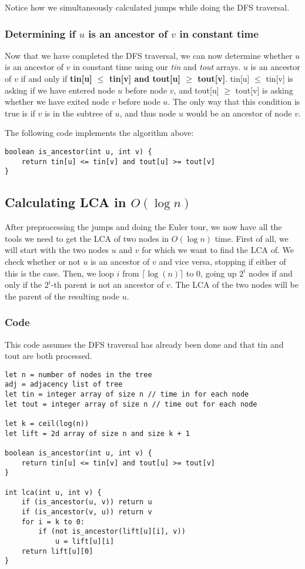 \documentclass{article}
\begin{document}
Notice how we simultaneously calculated jumps while doing the DFS traversal.


\subsubsection{Determining if $u$ is an ancestor of $v$ in constant time}
Now that we have completed the DFS traversal, we can now determine whether $u$ is an ancestor of $v$ in constant time using our \textit{tin} and \textit{tout} arrays. $u$ is an ancestor of $v$ if and only if \textbf{tin[u] $\leq$ tin[v] and tout[u] $\geq$ tout[v]}. tin[u] $\leq$ tin[v] is asking if we have entered node $u$ before node $v$, and tout[u] $\geq$ tout[v] is asking whether we have exited node $v$ before node $u$. The only way that this condition is true is if $v$ is in the subtree of $u$, and thus node $u$ would be an ancestor of node $v$.

The following code implements the algorithm above:
\begin{lstlisting}
boolean is_ancestor(int u, int v) {
	return tin[u] <= tin[v] and tout[u] >= tout[v]
}
\end{lstlisting}

\subsection{Calculating LCA in $O(\log n)$}
After preprocessing the jumps and doing the Euler tour, we now have all the tools we need to get the LCA of two nodes in $O(\log n)$ time. First of all, we will start with the two nodes $u$ and $v$ for which we want to find the LCA of. We check whether or not $u$ is an ancestor of $v$ and vice versa, stopping if either of this is the case. Then, we loop $i$ from $\lceil \log (n) \rceil $ to $0$, going up $2^i$ nodes if and only if the $2^i$-th parent is not an ancestor of $v$. The LCA of the two nodes will be the parent of the resulting node $u$.

\subsubsection{Code}
This code assumes the DFS traversal has already been done and that tin and tout are both processed.
\begin{lstlisting}
let n = number of nodes in the tree
adj = adjacency list of tree
let tin = integer array of size n // time in for each node
let tout = integer array of size n // time out for each node

let k = ceil(log(n))
let lift = 2d array of size n and size k + 1

boolean is_ancestor(int u, int v) {
	return tin[u] <= tin[v] and tout[u] >= tout[v]
}

int lca(int u, int v) {
	if (is_ancestor(u, v)) return u
	if (is_ancestor(v, u)) return v
	for i = k to 0:
		if (not is_ancestor(lift[u][i], v))
			u = lift[u][i]
	return lift[u][0]
}
\end{lstlisting}
\end{document}

